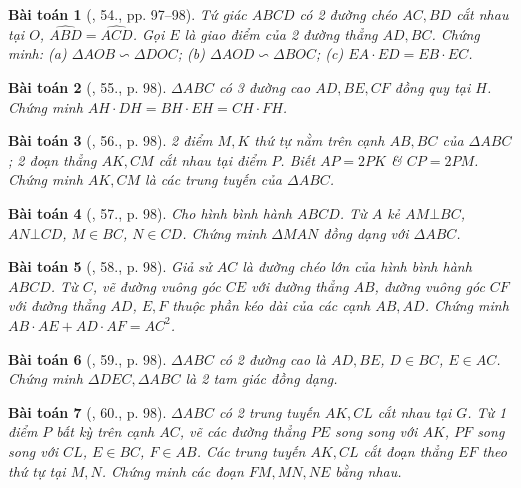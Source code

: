 \documentclass{article}
\newtheorem{baitoan}{Bài toán}
\begin{document}
\begin{baitoan}[\cite{SBT_Toan_8_tap_2}, 54., pp. 97--98]
	Tứ giác $ABCD$ có 2 đường chéo $AC,BD$ cắt nhau tại $O$, $\widehat{ABD} = \widehat{ACD}$. Gọi $E$ là giao điểm của 2 đường thẳng $AD,BC$. Chứng minh: (a) $\Delta AOB\backsim\Delta DOC$; (b) $\Delta AOD\backsim\Delta BOC$; (c) $EA\cdot ED = EB\cdot EC$.
\end{baitoan}

\begin{baitoan}[\cite{SBT_Toan_8_tap_2}, 55., p. 98]
	$\Delta ABC$ có 3 đường cao $AD,BE,CF$ đồng quy tại $H$. Chứng minh $AH\cdot DH = BH\cdot EH = CH\cdot FH$.
\end{baitoan}

\begin{baitoan}[\cite{SBT_Toan_8_tap_2}, 56., p. 98]
	2 điểm $M,K$ thứ tự nằm trên cạnh $AB,BC$ của $\Delta ABC$; 2 đoạn thẳng $AK,CM$ cắt nhau tại điểm $P$. Biết $AP = 2PK$ \& $CP = 2PM$. Chứng minh $AK,CM$ là các trung tuyến của $\Delta ABC$.
\end{baitoan}

\begin{baitoan}[\cite{SBT_Toan_8_tap_2}, 57., p. 98]
	Cho hình bình hành $ABCD$. Từ $A$ kẻ $AM\bot BC$, $AN\bot CD$, $M\in BC$, $N\in CD$. Chứng minh $\Delta MAN$ đồng dạng với $\Delta ABC$.
\end{baitoan}

\begin{baitoan}[\cite{SBT_Toan_8_tap_2}, 58., p. 98]
	Giả sử $AC$ là đường chéo lớn của hình bình hành $ABCD$. Từ $C$, vẽ đường vuông góc $CE$ với đường thẳng $AB$, đường vuông góc $CF$ với đường thẳng $AD$, $E,F$ thuộc phần kéo dài của các cạnh $AB,AD$. Chứng minh $AB\cdot AE + AD\cdot AF = AC^2$.
\end{baitoan}

\begin{baitoan}[\cite{SBT_Toan_8_tap_2}, 59., p. 98]
	$\Delta ABC$ có 2 đường cao là $AD,BE$, $D\in BC$, $E\in AC$. Chứng minh $\Delta DEC,\Delta ABC$ là 2 tam giác đồng dạng.
\end{baitoan}

\begin{baitoan}[\cite{SBT_Toan_8_tap_2}, 60., p. 98]
	$\Delta ABC$ có 2 trung tuyến $AK,CL$ cắt nhau tại $G$. Từ 1 điểm $P$ bất kỳ trên cạnh $AC$, vẽ các đường thẳng $PE$ song song với $AK$, $PF$ song song với $CL$, $E\in BC$, $F\in AB$. Các trung tuyến $AK,CL$ cắt đoạn thẳng $EF$ theo thứ tự tại $M,N$. Chứng minh các đoạn $FM,MN,NE$ bằng nhau.
\end{baitoan}


\printbibliography[heading=bibintoc]
	
\end{document}

